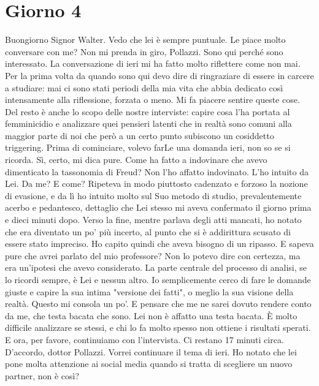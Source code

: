 \documentclass[a4paper,12pt]{article}
\newcommand{\Walter}{\speak{W}}
\newcommand{\Pollazzi}{\speak{P}}
\begin{document}
\section*{Giorno 4}
\begin{dialogue}
\Pollazzi  Buongiorno Signor Walter. Vedo che lei è sempre puntuale. Le piace molto conversare con me?
\Walter  Non mi prenda in giro, Pollazzi. Sono qui perché sono interessato. La conversazione di ieri mi ha fatto molto riflettere come non mai. Per la prima volta da quando sono qui devo dire di ringraziare di essere in carcere a studiare: mai ci sono stati periodi della mia vita che abbia dedicato così intensamente alla riflessione, forzata o meno.
\Pollazzi  Mi fa piacere sentire queste cose. Del resto è anche lo scopo delle nostre interviste: capire cosa l'ha portata al femminicidio e analizzare quei pensieri latenti che in realtà sono comuni alla maggior parte di noi che però a un certo punto subiscono un cosiddetto triggering.
\Walter  Prima di cominciare, volevo farLe una domanda ieri, non so se si ricorda.
\Pollazzi  Sì, certo, mi dica pure.
\Walter  Come ha fatto a indovinare che avevo dimenticato la tassonomia di Freud?
\Pollazzi  Non l'ho affatto indovinato. L'ho intuito da Lei.
\Walter  Da me? E come?
\Pollazzi  Ripeteva in modo piuttosto cadenzato e forzoso la nozione di evasione, e da lì ho intuito molto sul Suo metodo di studio, prevalentemente acerbo e pedantesco, dettaglio che Lei stesso mi aveva confermato il giorno prima e dieci minuti dopo. Verso la fine, mentre parlava degli atti mancati, ho notato che era diventato un po' più incerto, al punto che si è addirittura scusato di essere stato impreciso. Ho capito quindi che aveva bisogno di un ripasso.
\Walter  E sapeva pure che avrei parlato del mio professore?
\Pollazzi  Non lo potevo dire con certezza, ma era un'ipotesi che avevo considerato. La parte centrale del processo di analisi, se lo ricordi sempre, è Lei e nessun altro. Io semplicemente cerco di fare le domande giuste e capire la sua intima "versione dei fatti", o meglio la sua visione della realtà.
\Walter  Questo mi consola un po'. E pensare che me ne sarei dovuto rendere conto da me, che testa bacata che sono.
\Pollazzi  Lei non è affatto una testa bacata. È molto difficile analizzare se stessi, e chi lo fa molto spesso non ottiene i risultati sperati. E ora, per favore, continuiamo con l'intervista. Ci restano 17 minuti circa.
\Walter  D'accordo, dottor Pollazzi.
\Pollazzi  Vorrei continuare il tema di ieri. Ho notato che lei pone molta attenzione ai social media quando si tratta di scegliere un nuovo partner, non è così?

\end{dialogue}
\end{document}
